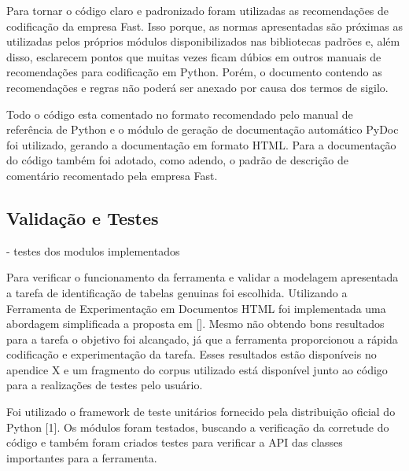 \documentclass{acm_proc_article-sp}
\numberwithin{equation}{section}
\begin{document}
Para tornar o código claro e padronizado foram utilizadas as
recomendações de codificação da empresa Fast.
Isso porque, as normas apresentadas são próximas as utilizadas pelos 
próprios módulos disponibilizados nas bibliotecas padrões e, além disso,
esclarecem pontos que muitas vezes ficam dúbios em outros manuais de 
recomendações para codificação em Python. Porém,
  o documento contendo as recomendações e regras não
  poderá ser anexado por causa dos termos de sigilo. 

Todo o código esta comentado no formato recomendado pelo manual de
referência de Python e o  módulo de geração de documentação automático
PyDoc foi utilizado, gerando a documentação em formato HTML. Para a
documentação do código também foi adotado, como adendo, o padrão de 
descrição de comentário recomentado pela empresa Fast.




\subsection{Validação e Testes}
- testes dos modulos implementados

Para verificar o funcionamento da ferramenta e validar a modelagem apresentada a tarefa de identificação de tabelas genuinas foi escolhida. Utilizando a Ferramenta de Experimentação em Documentos HTML foi implementada uma abordagem simplificada a proposta em []. Mesmo não obtendo bons resultados para a tarefa o objetivo foi alcançado, já que a ferramenta proporcionou a rápida codificação e experimentação da tarefa. Esses resultados estão disponíveis no apendice X e um fragmento do corpus utilizado está disponível junto ao código para a realizações de testes pelo usuário.

Foi utilizado o framework de teste unitários fornecido pela distribuição
oficial do Python [1]. Os módulos foram testados, buscando a verificação
da corretude do código e também foram criados testes para verificar a
API das classes importantes para a ferramenta.
\end{document}
